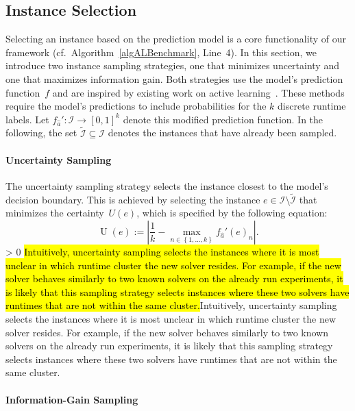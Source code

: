 \documentclass[sn-basic, Numbered]{sn-jnl} %
\newcommand{\showchanges}{1} %
\newcommand{\change}[1]{\ifnum \showchanges > 0 \sethlcolor{yellow}\hl{#1}\else#1\fi}
\begin{document}
\subsection{Instance Selection}
\label{sec:main:selection}

Selecting an instance based on the prediction model is a core functionality of our framework (cf.~Algorithm~\ref{algALBenchmark}, Line~4).
In this section, we introduce two instance sampling strategies, one that minimizes uncertainty and one that maximizes information gain.
Both strategies use the model's prediction function~$f$ and are inspired by existing work on active learning~\cite{settles2009active}.
These methods require the model's predictions to include probabilities for the $k$ discrete runtime labels.
Let $f_{\hat a}' : \mathcal{I} \rightarrow \left[0, 1\right]^k$ denote this modified prediction function.
In the following, the set $\tilde{\mathcal{I}} \subseteq \mathcal{I}$ denotes the instances that have already been sampled.

\paragraph{Uncertainty Sampling}

The uncertainty sampling strategy selects the instance closest to the model's decision boundary.
This is achieved by selecting the instance $e \in \mathcal{I} \setminus \tilde{\mathcal{I}}$ that minimizes the certainty~$U(e)$, which is specified by the following equation:
%
\begin{equation*}
  \operatorname{U}(e) := \left\lvert \frac{1}{k} - \max_{n \in \left\lbrace 1, \dots, k \right\rbrace} f_{\hat{a}}'(e)_{n} \right\rvert \text{.}
\end{equation*}
\change{Intuitively, uncertainty sampling selects the instances where it is most unclear in which runtime cluster the new solver resides.
For example, if the new solver behaves similarly to two known solvers on the already run experiments, it is likely that this sampling strategy selects instances where these two solvers have runtimes that are not within the same cluster.}

\paragraph{Information-Gain Sampling}
\end{document}
